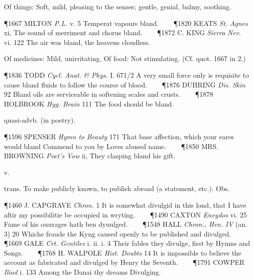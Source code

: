 \begin{description}[wide, labelwidth=!, labelindent=0pt]
\begin{myenumerate}
 Of things: Soft, mild, pleasing to the senses; gentle, genial, balmy, soothing.

\P 1667 MILTON  \textit{P.L.} v. 5 Temperat vapours bland.    
\P 1820 KEATS  \textit{St. Agnes} xi, The sound of merriment and chorus bland.    
\P 1872 C. KING  \textit{Sierra Nev.} vi. 122 The air was bland, the heavens cloudless.

 Of medicines: Mild, unirritating. Of food: Not stimulating. (Cf. quot. 1667 in 2.)

\P 1836 TODD  \textit{Cycl. Anat. \& Phys.} I. 671/2 A very small force only is requisite to cause bland fluids to follow the course of blood.    
\P 1876 DUHRING  \textit{Dis. Skin} 92 Bland oils are serviceable in softening scales and crusts.    
\P 1878 HOLBROOK  \textit{Hyg. Brain} 111 The food should be bland.

\noindent quasi-advb. (in poetry).

\P 1596 SPENSER  \textit{Hymn to Beauty} 171 That base affection, which your eares would bland Commend to you by Loves abused name.    
\P 1850 MRS. BROWNING  \textit{Poet's Vow} ii, They clasping bland his gift.
\end{myenumerate}

 v.

\noindent {}

\vspace{-0.3cm}

\begin{myenumerate}

 trans. To make publicly known, to publish abroad (a statement, etc.). Obs.

\P 1460 J. CAPGRAVE  \textit{Chron.} 1 It is somewhat divulgid in this lond, that I have aftir my possibilitie be occupied in wryting.    
\P 1490 CAXTON  \textit{Eneydos} vi. 25 Fame of his ouurages hath ben dyuulged.    
\P 1548 HALL  \textit{Chron., Hen. IV} (an. 3) 20 Whiche fraude the Kyng caused openly to be published and divulged.    
\P 1669 GALE  \textit{Crt. Gentiles} i. ii. i. 4 Their fables they divulge, first by Hymns and Songs.    
\P 1768 H. WALPOLE  \textit{Hist. Doubts} 14 It is impossible to believe the account as fabricated and divulged by Henry the Seventh.    
\P 1791 COWPER  \textit{Iliad} i. 133 Among the Danai thy dreams Divulging.


\end{myenumerate}
\end{description}
